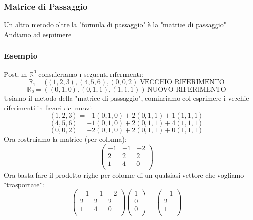 \subsubsection{Matrice di Passaggio}
Un altro metodo oltre la "formula di passaggio" è la "matrice di passaggio"\\
Andiamo ad esprimere 

\subsubsection{Esempio}
Posti in $\mathbb{R}^3$ consideriamo i seguenti riferimenti:
$$ \mathbb{R}_1 = ((1,2,3),(4,5,6),(0,0,2) \; \text{VECCHIO RIFERIMENTO} $$
$$ \mathbb{R}_2 = ((0,1,0),(0,1,1),(1,1,1)) \;  \text{NUOVO RIFERIMENTO}$$
Usiamo il metodo della "matrice di passaggio", cominciamo col esprimere i vecchie riferimenti in favori dei nuovi:
$$ (1,2,3) = -1(0,1,0) + 2(0,1,1)+1(1,1,1) $$
$$ (4,5,6) = -1(0,1,0) + 2(0,1,1)+4(1,1,1) $$
$$ (0,0,2) = -2(0,1,0) + 2(0,1,1)+0(1,1,1) $$
Ora costruiamo la matrice (per colonna):
$$\begin{pmatrix}
-1 & -1 & -2 \\
2 & 2 & 2 \\
1 & 4 & 0 \\
\end{pmatrix}$$
Ora basta fare il prodotto righe per colonne di un qualsiasi vettore che vogliamo "trasportare":
$$ 
\begin{pmatrix}
-1 & -1 & -2 \\
2 & 2 & 2 \\
1 & 4 & 0 \\
\end{pmatrix}
\begin{pmatrix}
1 \\
0 \\
0 \\
\end{pmatrix}
=
\begin{pmatrix}
-1 \\
2 \\
1 \\
\end{pmatrix}
$$

